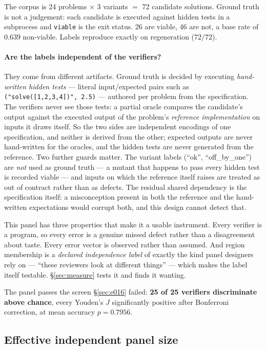 \documentclass[11pt,a4paper]{article}
\newcommand{\code}[1]{\texttt{#1}}
\begin{document}
The corpus is 24 problems $\times$ 3 variants $=$ 72 candidate solutions. Ground
truth is not a judgement: each candidate is executed against hidden tests in a
subprocess and \code{viable} is the exit status. 26 are viable, 46 are not, a
base rate of $0.639$ non-viable. Labels reproduce exactly on regeneration
($72/72$).

\paragraph{Are the labels independent of the verifiers?}
They come from different artifacts. Ground truth is decided by executing
\emph{hand-written hidden tests} --- literal input/expected pairs such as
\code{("solve([1,2,3,4])", 2.5)} --- authored per problem from the specification.
The verifiers never see those tests: a partial oracle compares the candidate's
output against the executed output of the problem's \emph{reference
implementation} on inputs it draws itself. So the two sides are independent
encodings of one specification, and neither is derived from the other; expected
outputs are never hand-written for the oracles, and the hidden tests are never
generated from the reference. Two further guards matter. The variant labels
(``ok'', ``off\_by\_one'') are \emph{not} used as ground truth --- a mutant that
happens to pass every hidden test is recorded viable --- and inputs on which the
reference itself raises are treated as out of contract rather than as defects.
The residual shared dependency is the specification itself: a misconception
present in both the reference and the hand-written expectations would corrupt
both, and this design cannot detect that.

This panel has three properties that make it a usable instrument. Every verifier
is a program, so every error is a genuine missed defect rather than a
disagreement about taste. Every error vector is observed rather than assumed. And
region membership is a \emph{declared independence label} of exactly the kind
panel designers rely on --- ``these reviewers look at different things'' --- which
makes the label itself testable. \S\ref{sec:measure} tests it and finds it
wanting.

The panel passes the screen \S\ref{sec:e016} failed: \textbf{25 of 25 verifiers
discriminate above chance}, every Youden's $J$ significantly positive after
Bonferroni correction, at mean accuracy $p = 0.7956$.

\subsection{Effective independent panel size}
\label{sec:neff}
\end{document}
